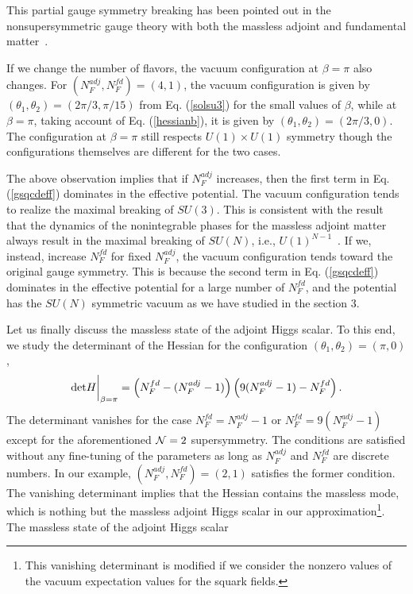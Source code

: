 \documentclass[a4paper,12pt]{article}
\begin{document}
This partial gauge symmetry breaking has been pointed out in 
the nonsupersymmetric gauge theory with both the massless adjoint and 
fundamental matter~\cite{intf}.
\par
If we change the number of flavors, the vacuum configuration 
at $\beta=\pi$ also changes. For $(N_F^{adj}, N_F^{fd})=(4, 1)$, the 
vacuum configuration is given by $(\theta_1, \theta_2)=(2\pi/3, \pi/15)$ 
from Eq. (\ref{solsu3}) for the small values of $\beta$, while
at $\beta=\pi$, taking account of Eq. (\ref{hessianb}), it is
given by $(\theta_1, \theta_2)=(2\pi/3, 0)$. The configuration
at $\beta=\pi$ still 
respects $U(1)\times U(1)$ symmetry though the configurations themselves
are different for the two cases.
\par
The above observation implies that if $N_F^{adj}$ increases, then the 
first term in Eq. (\ref{gsqcdeff}) dominates in the effective potential. 
The vacuum configuration
tends to realize the maximal breaking of $SU(3)$. This is consistent with
the result that the dynamics of the nonintegrable phases
for the massless adjoint matter always result in the maximal breaking of 
$SU(N)$, i.e., $U(1)^{N-1}$~\cite{takenagab}. If we, instead, increase 
$N_F^{fd}$ for fixed $N_F^{adj}$, the vacuum configuration tends toward 
the original gauge symmetry. 
This is because the second term in Eq. (\ref{gsqcdeff})  
dominates in the effective potential for a large number of $N_F^{fd}$, and 
the potential has the $SU(N)$ symmetric vacuum as we have studied in the
section $3$.
\par
Let us finally discuss the massless state of 
the adjoint Higgs scalar. To this end, we study
the determinant of the Hessian for the 
configuration $(\theta_1,\theta_2)=(\pi, 0)$,
\begin{equation}
{\rm det}H\bigg|_{\beta=\pi}
=\left(N_F^{fd}-(N_F^{adj}-1)\right)\left(9(N_F^{adj}-1)-N_F^{fd}\right).
\label{hessianc}
\end{equation}
The determinant vanishes for 
the case $N_F^{fd}=N_F^{adj}-1$ or $N_F^{fd}=9(N_F^{adj}-1)$ except for 
the aforementioned ${\cal N}=2$ supersymmetry. The conditions are
satisfied without any fine-tuning of the parameters as long 
as $N_F^{adj}$ and $N_F^{fd}$ are 
discrete numbers. 
In our example, $(N_F^{adj}, N_F^{fd})=(2, 1)$ satisfies 
the former condition. The vanishing determinant implies that the Hessian 
contains the massless mode, which
is nothing but the massless adjoint Higgs scalar 
in our approximation\footnote{This vanishing determinant is modified if we 
consider the nonzero values of the vacuum expectation values for 
the squark fields.}. The massless state of the adjoint Higgs scalar 
\end{document}

